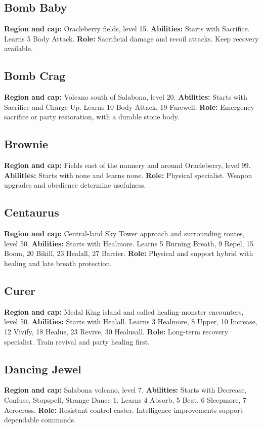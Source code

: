 \subsection{Bomb Baby}
\textbf{Region and cap:} Oracleberry fields, level 15.
\textbf{Abilities:} Starts with Sacrifice. Learns 5 Body Attack.
\textbf{Role:} Sacrificial damage and recoil attacks. Keep recovery available.

\subsection{Bomb Crag}
\textbf{Region and cap:} Volcano south of Salabona, level 20.
\textbf{Abilities:} Starts with Sacrifice and Charge Up. Learns 10 Body Attack,
19 Farewell.
\textbf{Role:} Emergency sacrifice or party restoration, with a durable stone body.

\subsection{Brownie}
\textbf{Region and cap:} Fields east of the nunnery and around Oracleberry, level 99.
\textbf{Abilities:} Starts with none and learns none.
\textbf{Role:} Physical specialist. Weapon upgrades and obedience determine usefulness.

\subsection{Centaurus}
\textbf{Region and cap:} Central-land Sky Tower approach and surrounding routes, level 50.
\textbf{Abilities:} Starts with Healmore. Learns 5 Burning Breath, 9 Repel,
15 Boom, 20 Bikill, 23 Healall, 27 Barrier.
\textbf{Role:} Physical and support hybrid with healing and late breath protection.

\subsection{Curer}
\textbf{Region and cap:} Medal King island and called healing-monster encounters, level 50.
\textbf{Abilities:} Starts with Healall. Learns 3 Healmore, 8 Upper,
10 Increase, 12 Vivify, 18 Healus, 23 Revive, 30 Healusall.
\textbf{Role:} Long-term recovery specialist. Train revival and party healing first.

\subsection{Dancing Jewel}
\textbf{Region and cap:} Salabona volcano, level 7.
\textbf{Abilities:} Starts with Decrease, Confuse, Stopspell, Strange Dance 1.
Learns 4 Absorb, 5 Beat, 6 Sleepmore, 7 Aerocross.
\textbf{Role:} Resistant control caster. Intelligence improvements support dependable commands.

